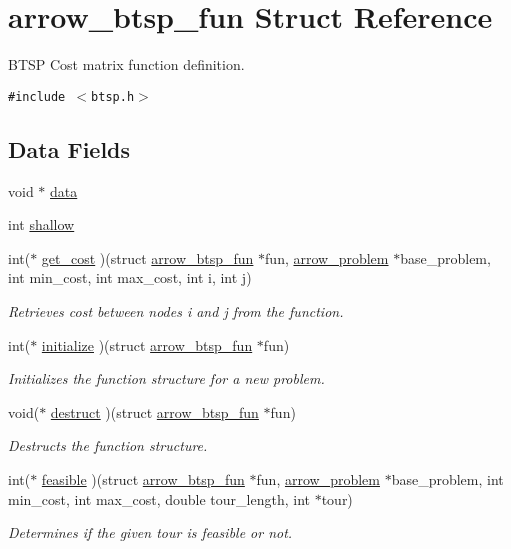 \hypertarget{structarrow__btsp__fun}{
\section{arrow\_\-btsp\_\-fun Struct Reference}
\label{structarrow__btsp__fun}
}
BTSP Cost matrix function definition.  


{\tt \#include $<$btsp.h$>$}

\subsection*{Data Fields}
\begin{CompactItemize}
\item 
void $\ast$ \hyperlink{structarrow__btsp__fun_9c1a276685fb0cac372faef2dd2ba99a}{data}
\item 
int \hyperlink{structarrow__btsp__fun_1950686e4862a4b1bd68d1ada85e2c79}{shallow}
\item 
int($\ast$ \hyperlink{structarrow__btsp__fun_ffc634f9d1a545f890b0b2007aff544d}{get\_\-cost} )(struct \hyperlink{structarrow__btsp__fun}{arrow\_\-btsp\_\-fun} $\ast$fun, \hyperlink{structarrow__problem}{arrow\_\-problem} $\ast$base\_\-problem, int min\_\-cost, int max\_\-cost, int i, int j)
\begin{CompactList}\small\item\em Retrieves cost between nodes i and j from the function. \item\end{CompactList}\item 
int($\ast$ \hyperlink{structarrow__btsp__fun_c588686921bd526653a7e0d7816aee44}{initialize} )(struct \hyperlink{structarrow__btsp__fun}{arrow\_\-btsp\_\-fun} $\ast$fun)
\begin{CompactList}\small\item\em Initializes the function structure for a new problem. \item\end{CompactList}\item 
void($\ast$ \hyperlink{structarrow__btsp__fun_6c66b7591252728aaa441139c623446a}{destruct} )(struct \hyperlink{structarrow__btsp__fun}{arrow\_\-btsp\_\-fun} $\ast$fun)
\begin{CompactList}\small\item\em Destructs the function structure. \item\end{CompactList}\item 
int($\ast$ \hyperlink{structarrow__btsp__fun_98369e55806c13b3ba90c8c1cbe1f8a4}{feasible} )(struct \hyperlink{structarrow__btsp__fun}{arrow\_\-btsp\_\-fun} $\ast$fun, \hyperlink{structarrow__problem}{arrow\_\-problem} $\ast$base\_\-problem, int min\_\-cost, int max\_\-cost, double tour\_\-length, int $\ast$tour)
\begin{CompactList}\small\item\em Determines if the given tour is feasible or not. \item\end{CompactList}\end{CompactItemize}


